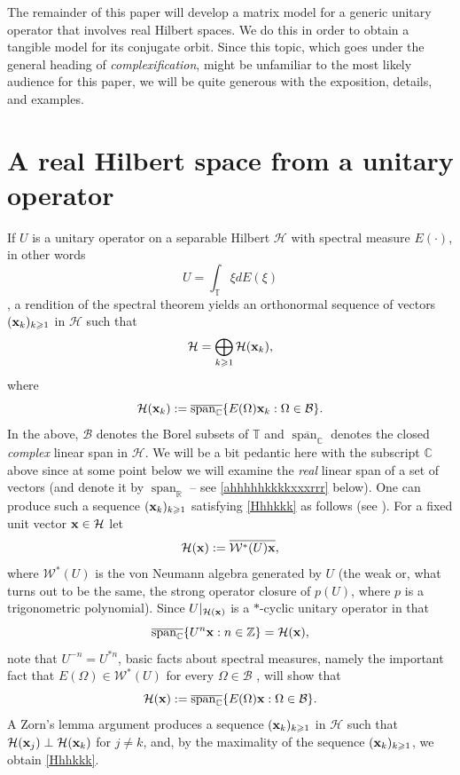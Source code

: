 \documentclass{dis}
\theoremstyle{plain}
\theoremstyle{definition}
\def\C{\mathbb{C}}
\def\R{\mathbb{R}}
\def\T{\mathbb{T}}
\def\Z{\mathbb{Z}}
\renewcommand{\geq}{\geqslant}
\renewcommand{\vec}[1]{{\bf #1}}
\newcommand{\0}{{\color{lightgray}0}}
\begin{document}
The remainder of this paper will develop a matrix model for a generic unitary operator that involves real Hilbert spaces. We do this in order to obtain a tangible model for its conjugate orbit. Since this topic, which goes under the general heading of {\em complexification},  might be unfamiliar to the most likely audience for this paper, we will be quite generous with the exposition, details, and  examples. 

\section{A real Hilbert space from a unitary operator}



If $U$ is a unitary operator on a separable Hilbert $\mathcal{H}$ with spectral measure $E(\cdot)$, in other words
\begin{equation}\label{spectralrep}
U = \int_{\T} \xi dE(\xi)
\end{equation}
\cite[p.~269]{ConwayFA},
 a rendition of the spectral theorem yields an orthonormal sequence of vectors $(\vec{x}_k)_{k \geq 1}$ in $\mathcal{H}$ such that
\begin{equation}\label{Hhhkkk}
\mathcal{H} = \bigoplus_{k \geq 1} \mathcal{H}(\vec{x}_k),
\end{equation} where
$$\mathcal{H}(\vec{x}_k) := \overline{\operatorname{span}_{\C}}\{E(\Omega) \vec{x}_k: \Omega \in \mathcal{B}\}.$$
In the above, $\mathcal{B}$ denotes the Borel subsets of $\T$ and $\overline{\operatorname{span}_{\C}}$ denotes the closed {\em complex} linear span in $\mathcal{H}$. We will be a bit pedantic here with the subscript $\C$ above since at some point below we will  examine the {\em real} linear span of a set of vectors (and denote it by $\operatorname{span}_{\R}$ -- see \eqref{ahhhhhkkkkxxxrrr} below).
One can produce such a sequence $(\vec{x}_k)_{k \geq 1}$ satisfying \eqref{Hhhkkk}  as follows (see \cite[p.~300]{ConwayFA}). For a fixed unit vector $\vec{x} \in \mathcal{H}$ let
$$\mathcal{H}(\vec{x}) := \overline{\mathcal{W}^{*}(U) \vec{x}},$$
where $\mathcal{W}^{*}(U)$ is the von Neumann algebra generated by $U$ (the weak or, what turns out to be the same, the  strong operator closure of $p(U)$, where $p$ is a trigonometric polynomial). Since $U|_{\mathcal{H}(\vec{x})}$ is a $\ast$-cyclic unitary operator in that
$$\overline{\operatorname{span}_{\C}}\{ U^{n} \vec{x}: n \in \Z\} = \mathcal{H}(\vec{x}),$$ 
note that $U^{-n} = U^{*n}$, 
  basic facts about spectral measures, namely the important fact that $E(\Omega) \in \mathcal{W}^{*}(U)$ for every $\Omega \in \mathcal{B}$ \cite[p.~292]{ConwayFA},  will show that
\begin{equation}\label{88hhHCCNNccc12}
\mathcal{H}(\vec{x}) := \overline{\operatorname{span}_{\C}}\{E(\Omega) \vec{x}: \Omega \in \mathcal{B}\}.
\end{equation}
A Zorn's lemma argument produces a sequence $(\vec{x}_k)_{k \geq 1}$ in $\mathcal{H}$ such that
$\mathcal{H}(\vec{x}_j) \perp \mathcal{H}(\vec{x}_{k})$ for $j \not = k$, and, by  the maximality of the sequence $(\vec{x}_k)_{k \geq 1}$, we obtain \eqref{Hhhkkk}.
\end{document}
